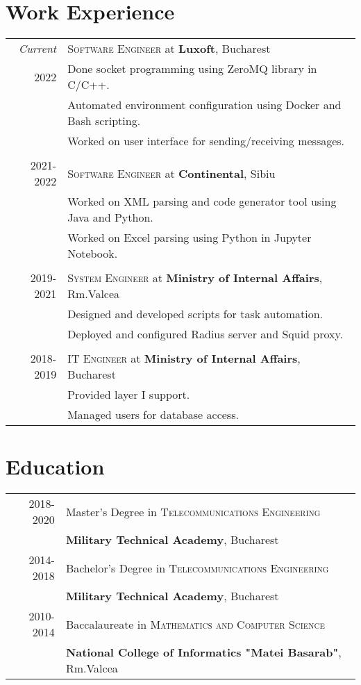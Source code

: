 \documentclass[a4paper,10pt]{article}
\begin{document}
\section{Work Experience}
\begin{tabular}{r|p{11cm}}

\emph{Current}
&\textsc{Software Engineer} at \textbf{Luxoft}, Bucharest\\
\textsc{2022}
&\footnotesize{Done socket programming using ZeroMQ library in C/C++.}\\
&\footnotesize{Automated environment configuration using Docker and Bash scripting.}\\
&\footnotesize{Worked on user interface for sending/receiving messages.}\\
\multicolumn{2}{c}{}\\
\textsc{2021-2022}
&\textsc{Software Engineer} at \textbf{Continental}, Sibiu\\
&\footnotesize{Worked on XML parsing and code generator tool using Java and Python.}\\
&\footnotesize{Worked on Excel parsing using Python in Jupyter Notebook.}\\
\multicolumn{2}{c}{}\\
\textsc{2019-2021} 
  &\textsc{System Engineer} at \textbf{Ministry of Internal Affairs}, Rm.Valcea\\
&\footnotesize{
  Designed and developed scripts for task automation.}\\
&\footnotesize{
  Deployed and configured Radius server and Squid proxy.}\\
\multicolumn{2}{c}{}\\
\textsc{2018-2019} 
&\textsc{IT Engineer} at \textbf{Ministry of Internal Affairs}, Bucharest\\
&\footnotesize{Provided layer I support.}\\
&\footnotesize{Managed users for database access.}\\
\end{tabular}

\section{Education}
\begin{tabular}{rl}
\textsc{2018-2020}&Master's Degree in 
  \textsc{Telecommunications Engineering}\\
  &\textbf{Military Technical Academy}, Bucharest\\
\textsc{2014-2018}&Bachelor's Degree in
  \textsc{Telecommunications Engineering}\\
  &\textbf{Military Technical Academy}, Bucharest\\
\textsc{2010-2014}&Baccalaureate in 
  \textsc{Mathematics and Computer Science}\\
  &\textbf{National College of Informatics "Matei Basarab"}, Rm.Valcea\\
\end{tabular}
\end{document}
